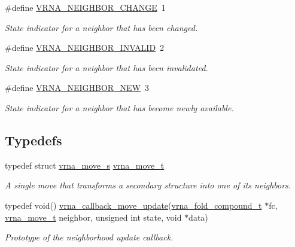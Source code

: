\begin{DoxyCompactItemize}
\#define \mbox{\hyperlink{group__neighbors_gae72b0e349b6108c00737df51cce44622}{V\+R\+N\+A\+\_\+\+N\+E\+I\+G\+H\+B\+O\+R\+\_\+\+C\+H\+A\+N\+GE}}~1
\begin{DoxyCompactList}\small\item\em State indicator for a neighbor that has been changed. \end{DoxyCompactList}\item 
\#define \mbox{\hyperlink{group__neighbors_gaf7e3417828057ae0ed4d0de03178116a}{V\+R\+N\+A\+\_\+\+N\+E\+I\+G\+H\+B\+O\+R\+\_\+\+I\+N\+V\+A\+L\+ID}}~2
\begin{DoxyCompactList}\small\item\em State indicator for a neighbor that has been invalidated. \end{DoxyCompactList}\item 
\#define \mbox{\hyperlink{group__neighbors_ga9343dd62daad15b6b8c55c1260c09228}{V\+R\+N\+A\+\_\+\+N\+E\+I\+G\+H\+B\+O\+R\+\_\+\+N\+EW}}~3
\begin{DoxyCompactList}\small\item\em State indicator for a neighbor that has become newly available. \end{DoxyCompactList}\end{DoxyCompactItemize}
\subsection*{Typedefs}
\begin{DoxyCompactItemize}
\item 
\mbox{\label{group__neighbors_ga08630e00206cd163ea29c462bf5f4755}} 
typedef struct \mbox{\hyperlink{group__neighbors_structvrna__move__s}{vrna\+\_\+move\+\_\+s}} \mbox{\hyperlink{group__neighbors_ga08630e00206cd163ea29c462bf5f4755}{vrna\+\_\+move\+\_\+t}}
\begin{DoxyCompactList}\small\item\em A single move that transforms a secondary structure into one of its neighbors. \end{DoxyCompactList}\item 
typedef void() \mbox{\hyperlink{group__neighbors_ga4605019694e3d38e2c40d5a97ef99920}{vrna\+\_\+callback\+\_\+move\+\_\+update}}(\mbox{\hyperlink{group__fold__compound_ga1b0cef17fd40466cef5968eaeeff6166}{vrna\+\_\+fold\+\_\+compound\+\_\+t}} $\ast$fc, \mbox{\hyperlink{group__neighbors_ga08630e00206cd163ea29c462bf5f4755}{vrna\+\_\+move\+\_\+t}} neighbor, unsigned int state, void $\ast$data)
\begin{DoxyCompactList}\small\item\em Prototype of the neighborhood update callback. \end{DoxyCompactList}\end{DoxyCompactItemize}
